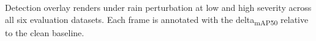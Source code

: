 \caption{Detection overlay renders under rain perturbation at low and high severity across all six evaluation datasets. Each frame is annotated with the delta\textsubscript{mAP50} relative to the clean baseline.}\label{fig:perturbation-plate-rain}
